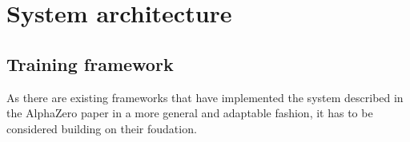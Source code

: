 \section{System architecture}

\subsection{Training framework}
As there are existing frameworks that have implemented the system described in the AlphaZero paper in a more general and adaptable fashion, it has to be considered building on their foudation.
